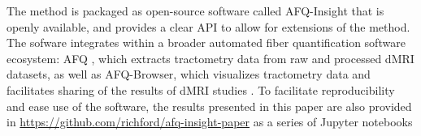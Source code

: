 The method is packaged as open-source software called AFQ-Insight that is openly
available, and provides a clear API to allow for extensions of the method. The
sofware integrates within a broader automated fiber quantification software
ecosystem: AFQ \cite{yeatman2012tract}, which extracts tractometry data from raw
and processed dMRI datasets, as well as AFQ-Browser, which visualizes
tractometry data and facilitates sharing of the results of dMRI studies
\cite{yeatman2018browser}. To facilitate reproducibility and ease use of the
software, the results presented in this paper are also provided in
\url{https://github.com/richford/afq-insight-paper} as a series of Jupyter
notebooks
\cite{kluyver2016jupyter}

